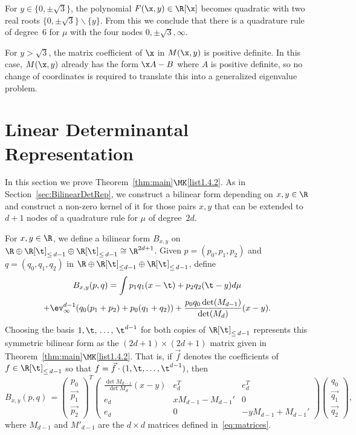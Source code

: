 \begin{exam}
For $y\in \{0,\pm \sqrt 3\}$, the polynomial $F(\x,y)\in \R[\x]$ becomes quadratic with two real roots $\{0,\pm \sqrt{3}\}\backslash\{y\}$. From this we conclude that there is a quadrature rule of degree~$6$ for $\mu$ with the four nodes $0,\pm \sqrt 3, \infty$.

For $y>\sqrt{3}$, the matrix coefficient of $\x$ in $M(\x,y)$ is positive definite. In this case, $M(\x,y)$ already has the form $\x A-B$ where $A$ is positive definite, so no change of coordinates is required to translate this into a generalized eigenvalue problem.
\end{exam}



\section{Linear Determinantal Representation}\label{sec:LinearDetRep}

In this section we prove Theorem~\ref{thm:main}$\MK$\eqref{list1.4.2}. As in Section~\ref{sec:BilinearDetRep}, we construct a bilinear form depending on $x,y\in \R$ and construct a non-zero kernel of it for those pairs $x,y$ that can be extended to $d+1$ nodes of a quadrature rule for $\mu$ of degree~$2d$.

For $x,y\in \R$, we define a bilinear form $B_{x,y}$ on $\R \oplus \R[\t]_{\leq\,d-1} \oplus \R[\t]_{\leq\,d-1} \cong \R^{2d+1}$. Given $p = (p_0, p_1, p_2)$ and $q = (q_0,q_1,q_2)$ in $\R \oplus \R[\t]_{\leq d-1} \oplus \R[\t]_{\leq\,d-1}$, define
\begin{multline*}
B_{x,y}(p,q) = \int p_1q_1 (x-\t) + p_2q_2 (\t-y) d\mu \\
+ \ev^{d-1}_{\infty}(q_0(p_1+p_2)+p_0(q_1+q_2)) +\frac{p_0q_0\det(M_{d-1})}{\det(M_d)}(x-y).
\end{multline*}
Choosing the basis $1,\t,\,\hdots,\,\t^{d-1}$ for both copies of $\R[\t]_{\leq\,d-1}$ represents this symmetric bilinear form as the $(2d+1)\times (2d+1)$ matrix given in Theorem~\ref{thm:main}$\MK$\eqref{list1.4.2}. That is, if $\vec f$ denotes the coefficients of $f\in \R[\t]_{\leq\,d -1}$ so that $f = \vec{f} \cdot (1,\t,\hdots, \t^{d-1})$, then
\[
B_{x,y}(p,q) \, =
\begin{pmatrix}
p_0 \\ \vec{p_1} \\ \vec{p_2}
\end{pmatrix}^T
\begin{pmatrix}
\frac{\det M_{d-1}}{\det M_d} (x-y) &e_d^T&e_d^T\\
e_d&xM_{d-1}-M_{d-1}'&0\\
e_d&0&-yM_{d-1}+M_{d-1}'
\end{pmatrix}
\begin{pmatrix}
q_0 \\ \vec{q_1} \\ \vec{q_2}
\end{pmatrix},
\]
where $M_{d-1}$ and $M'_{d-1}$ are the $d\times d$ matrices defined in~\eqref{eq:matrices}.



